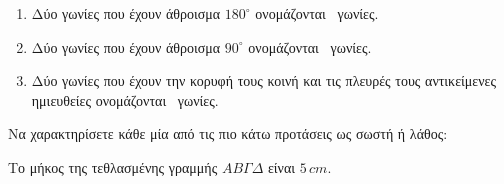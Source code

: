 \documentclass[12pt,a4page]{article}
\def\blank{\lowerdots[0ex]{10}}
\begin{document}
\begin{exercise}
\begin{enumerate}[label=\arabic*.,leftmargin=14pt,itemsep=2ex]
  \item Δύο γωνίες που έχουν άθροισμα $180^\circ$ ονομάζονται \blank\ γωνίες.
    
  \item Δύο γωνίες που έχουν άθροισμα $90^\circ$ ονομάζονται \blank\ γωνίες.
    
  \item Δύο γωνίες που έχουν την κορυφή τους κοινή και τις πλευρές τους αντικείμενες ημιευθείες ονομάζονται \blank\ γωνίες.
    
  \end{enumerate}
\item Να χαρακτηρίσετε κάθε μία από τις πιο κάτω προτάσεις ως σωστή ή λάθος:

  \vspace{-1.5ex}

  \begin{truefalse}
  \item Το μήκος της τεθλασμένης γραμμής $AB\Gamma\Delta$ είναι $5\,cm$.\\
    

\end{truefalse}
\end{exercise}
\end{document}
